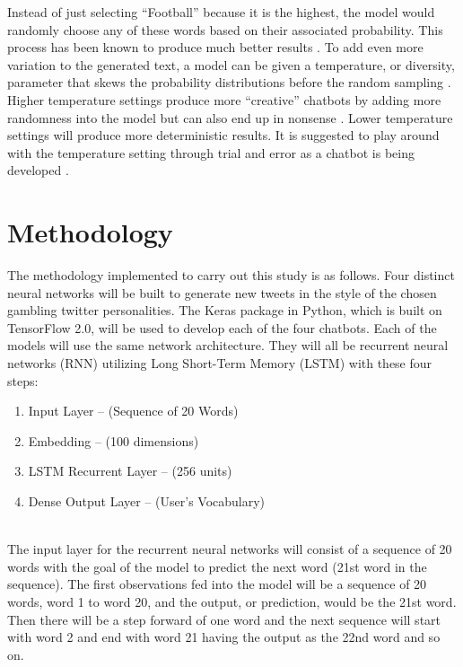 \documentclass[5p,authoryear]{elsarticle}
\begin{document}
Instead of just selecting “Football” because it is the highest, the model would randomly choose any of these words based on their associated probability. This process has been known to produce much better results \citep{lane}. To add even more variation to the generated text, a model can be given a temperature, or diversity, parameter that skews the probability distributions before the random sampling \citep{foster}. Higher temperature settings produce more “creative” chatbots by adding more randomness into the model but can also end up in nonsense \citep{lane}. Lower temperature settings will produce more deterministic results. It is suggested to play around with the temperature setting through trial and error as a chatbot is being developed \citep{foster}.



\section{Methodology}\label{meth}

The methodology implemented to carry out this study is as follows. Four distinct neural networks will be built to generate new tweets in the style of the chosen gambling twitter personalities. The Keras package in Python, which is built on TensorFlow 2.0, will be used to develop each of the four chatbots. Each of the models will use the same network architecture. They will all be recurrent neural networks (RNN) utilizing Long Short-Term Memory (LSTM) with these four steps:


\begin{enumerate}
 \item Input Layer – (Sequence of 20 Words)
 \item Embedding – (100 dimensions)
 \item LSTM Recurrent Layer – (256 units)
 \item Dense Output Layer – (User’s Vocabulary)
\end{enumerate} \\


The input layer for the recurrent neural networks will consist of a sequence of 20 words with the goal of the model to predict the next word (21st word in the sequence). The first observations fed into the model will be a sequence of 20 words, word 1 to word 20, and the output, or prediction, would be the 21st word. Then there will be a step forward of one word and the next sequence will start with word 2 and end with word 21 having the output as the 22nd word and so on.\\
\end{document}
